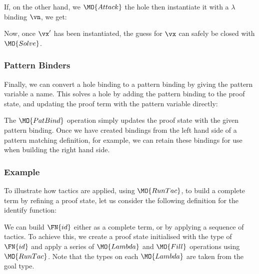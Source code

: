 \DM{
\AR{
\lam{\vn}{\va}\SC\hole{\vx}{\vb}\SC\vx\:\ve
}
}

\noindent
If, on the other hand, we $\MO{Attack}$ the hole then instantiate it with
a $\lambda$ binding $\vn$, we get:


\noindent
Now, once $\vx'$ has been instantiated, the guess for $\vx$ can safely be
closed with $\MO{Solve}$.

\subsubsection{Pattern Binders}

Finally, we can convert a hole binding to a pattern binding by giving the 
pattern variable a name. This solves a hole
by adding the pattern binding to the proof state, and updating the proof term
with the pattern variable directly:


The $\MO{PatBind}$ operation simply updates the proof state with the given pattern
binding. Once we have created bindings from the left hand side of a pattern
matching definition, for example, we can retain these bindings for use when
building the right hand side.

\subsubsection{Example}

To illustrate how tactics are applied, using $\MO{RunTac}$, to build a
complete term by refining a proof state, let us consider the following
\TT{} definition for the identify function:


We can build $\FN{id}$ either as a complete term, or by applying a sequence of
tactics.  To achieve this, we create a proof state initialised with the type of
$\FN{id}$ and apply a series of $\MO{Lambda}$ and $\MO{Fill}$ operations using
$\MO{RunTac}$.  Note that the types on each $\MO{Lambda}$ are taken from
the goal type.

